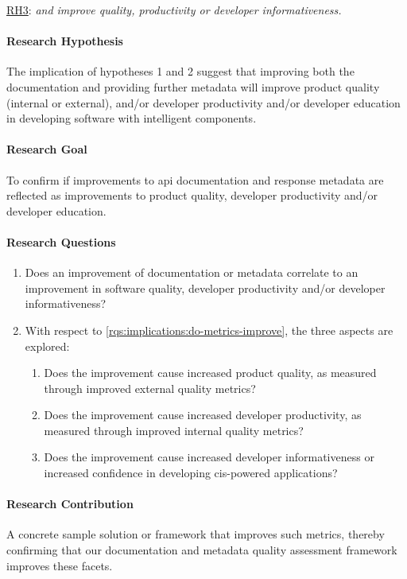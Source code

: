 \begin{titled-frame}{\underline{RH3}: \textit{ and  improve quality,  productivity or developer informativeness.}}
\label{rh3}
\vspace{-12pt}
\paragraph{Research Hypothesis}
The implication of hypotheses 1 and 2 suggest that improving both the documentation and providing further metadata will improve product quality (internal or external), and/or developer productivity and/or developer education in developing software with intelligent components.

\paragraph{Research Goal}
 To confirm if improvements to \gls{api} documentation and response metadata  are reflected as improvements to product quality, developer productivity and/or developer education.

\paragraph{Research Questions}
\begin{enumerate}[label=\textbf{RQ3.\arabic*.}, ref=RQ3.\arabic*, leftmargin=3.5\parindent, rightmargin=1\parindent]
  \item  Does an improvement of documentation or metadata correlate to an improvement in software quality, developer productivity and/or developer informativeness?
  \label{rqs:implications:do-metrics-improve}
  
  \item With respect to \ref{rqs:implications:do-metrics-improve}, the three aspects are explored:
  \begin{enumerate}
  \item Does the improvement cause increased product quality, as measured through improved external quality metrics?
  \item Does the improvement cause increased developer productivity, as measured through improved internal quality metrics?
  \item Does the improvement cause increased developer informativeness or increased confidence in developing \gls{cis}-powered applications?
  \end{enumerate}
  \label{rqs:implications:aspects}  
\end{enumerate}

\paragraph{Research Contribution}
A concrete sample solution or framework that improves such metrics, thereby confirming that our documentation and metadata quality assessment framework improves these facets.
\end{titled-frame}

